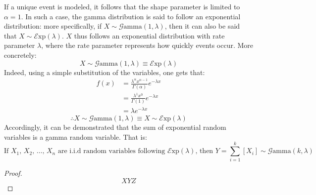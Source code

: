 \documentclass[12pt]{article}
\newcommand{\G}{\mathcal{G}}
\newcommand{\E}{\mathcal{E}}
\begin{document}
If a unique event is modeled, it follows that the shape parameter is limited to $\alpha = 1$. In such a case, the gamma
distribution is said to follow an exponential distribution: more specifically, if $X\sim\G\text{amma}(1, \lambda)$, then
it can also be said that $X\sim\E\text{xp}(\lambda)$. $X$ thus follows an exponential distribution with rate parameter
$\lambda$, where the rate parameter represents how quickly events occur. More concretely:
\begin{equation*}
	X\sim\G\text{amma}(1, \lambda)\equiv\E\text{xp}(\lambda)
\end{equation*}
Indeed, using a simple substitution of the variables, one gets that:
\begin{equation*}\label{eq:relation:exp}
	\begin{split}
		f(x)	&=	\frac{\lambda^\alpha x^{\alpha-1}}{\Gamma(\alpha)}e^{-\lambda x}\\
				&=	\frac{\lambda^1 x^{0}}{\Gamma(1)}e^{-\lambda x}\\
				&=	\lambda e^{-\lambda x}
	\end{split}
\end{equation*}
\begin{equation*}
	\therefore X\sim\G\text{amma}(1, \lambda)\equiv X\sim\E\text{xp}(\lambda)
\end{equation*}
Accordingly, it can be demonstrated that the sum of exponential random variables is a gamma random variable. That is:
\begin{equation*}
	\text{If } X_1,\,X_2,\,\ldots,\,X_n \text{ are i.i.d random variables following } \E\text{xp}(\lambda)\text{, then }Y=\sum^k_{i=1}\left[X_i\right]\sim\G\text{amma}(k, \lambda)
\end{equation*}
\begin{proof}
	\begin{equation*}
		XYZ
	\end{equation*}
\end{proof}

\end{document}
